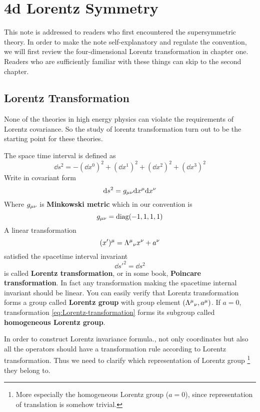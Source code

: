 \chapter{4d Lorentz Symmetry}

This note is addressed to readers who first encountered the supersymmetric theory. In order to make the note self-explanatory and regulate the convention, we will first review the four-dimensional Lorentz transformation in chapter one.  Readers who are sufficiently familiar with these things can skip to the second chapter.

\section{Lorentz Transformation}

None of the theories in high energy physics can violate the requirements of Lorentz covariance. So the study of lorentz transformation turn out to be the starting point for these theories.

The space time interval is defined as
\begin{equation}
  \dd s^2 = -(\dd x^0)^2+(\dd x^1)^2+(\dd x^2)^2+(\dd x^3)^2
\end{equation}
Write in covariant form
\begin{equation}
  \dd s^2 =g_{\mu\nu}\dd x^{\mu}\dd x^{\nu}
\end{equation}
Where $g_{\mu\nu}$ is \textbf{Minkowski metric} which in our convention is
\begin{equation}
  g_{\mu\nu} =\text{diag}(-1,1,1,1)
\end{equation}
A linear transformation
\begin{equation} \label{eq:Lorentz-transformation}
  (x')^{\mu} = {\Lambda^{\mu}}_{\nu} x^{\nu} + a^{\nu}
\end{equation}
satisfied the spacetime interval invariant
\begin{equation} \label{eq:Lorentz-invariance}
  \dd s'^2=\dd s^2
\end{equation}
is called \textbf{Lorentz transformation}, or in some book, \textbf{Poincare transformation}. In fact any transformation making the spacetime internal invariant should be linear. You can easily verify that Lorentz transformation forms a group called \textbf{Lorentz group} with group element $({\Lambda^{\mu}}_{\nu}, a^{\mu})$. If $a = 0$, transformation \eqref{eq:Lorentz-transformation} forms its subgroup called \textbf{homogeneous Lorentz group}.

In order to construct Lorentz invariance formula., not only coordinates but also all the operators should have a transformation rule according to Lorentz transformation. Thus we need to clarify which representation of Lorentz group \footnote{More especially the homogeneous Lorentz group ($a=0$), since representation of translation is somehow trivial.} they belong to.

